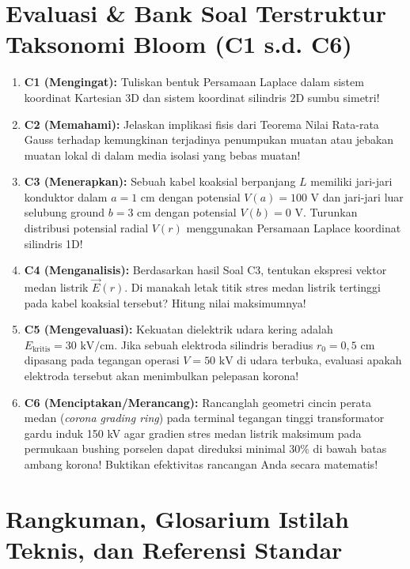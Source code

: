 \documentclass[11pt,a4paper]{article}
\theoremstyle{definition}
\begin{document}
\section{Evaluasi \& Bank Soal Terstruktur Taksonomi Bloom (C1 s.d. C6)}

\begin{enumerate}[leftmargin=*]
    \item \textbf{C1 (Mengingat):} 
    Tuliskan bentuk Persamaan Laplace dalam sistem koordinat Kartesian 3D dan sistem koordinat silindris 2D sumbu simetri!
    
    \item \textbf{C2 (Memahami):} 
    Jelaskan implikasi fisis dari Teorema Nilai Rata-rata Gauss terhadap kemungkinan terjadinya penumpukan muatan atau jebakan muatan lokal di dalam media isolasi yang bebas muatan!
    
    \item \textbf{C3 (Menerapkan):} 
    Sebuah kabel koaksial berpanjang $L$ memiliki jari-jari konduktor dalam $a = 1\text{ cm}$ dengan potensial $V(a) = 100\text{ V}$ dan jari-jari luar selubung ground $b = 3\text{ cm}$ dengan potensial $V(b) = 0\text{ V}$. Turunkan distribusi potensial radial $V(r)$ menggunakan Persamaan Laplace koordinat silindris 1D!
    
    \item \textbf{C4 (Menganalisis):} 
    Berdasarkan hasil Soal C3, tentukan ekspresi vektor medan listrik $\vec{E}(r)$. Di manakah letak titik stres medan listrik tertinggi pada kabel koaksial tersebut? Hitung nilai maksimumnya!
    
    \item \textbf{C5 (Mengevaluasi):} 
    Kekuatan dielektrik udara kering adalah $E_{\text{kritis}} = 30\text{ kV/cm}$. Jika sebuah elektroda silindris beradius $r_0 = 0{,}5\text{ cm}$ dipasang pada tegangan operasi $V = 50\text{ kV}$ di udara terbuka, evaluasi apakah elektroda tersebut akan menimbulkan pelepasan korona!
    
    \item \textbf{C6 (Menciptakan/Merancang):} 
    Rancanglah geometri cincin perata medan (\textit{corona grading ring}) pada terminal tegangan tinggi transformator gardu induk 150 kV agar gradien stres medan listrik maksimum pada permukaan bushing porselen dapat direduksi minimal $30\%$ di bawah batas ambang korona! Buktikan efektivitas rancangan Anda secara matematis!
\end{enumerate}

\section{Rangkuman, Glosarium Istilah Teknis, dan Referensi Standar}
\end{document}
